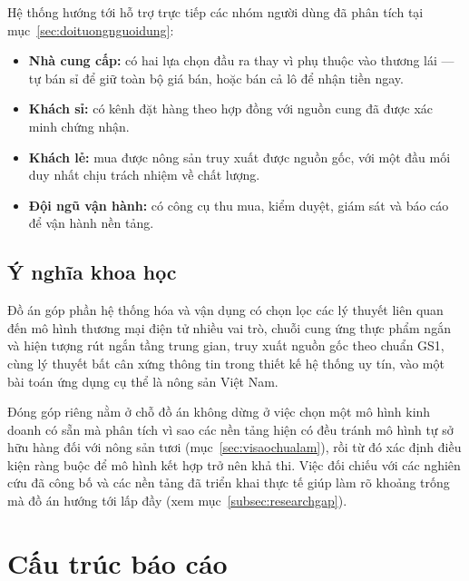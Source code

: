 Hệ thống hướng tới hỗ trợ trực tiếp các nhóm người dùng đã phân tích tại mục~\ref{sec:doituongnguoidung}:
\begin{itemize}
    \item \textbf{Nhà cung cấp:} có hai lựa chọn đầu ra thay vì phụ thuộc vào thương lái --- tự bán sỉ để giữ toàn bộ giá bán, hoặc bán cả lô để nhận tiền ngay.
    \item \textbf{Khách sỉ:} có kênh đặt hàng theo hợp đồng với nguồn cung đã được xác minh chứng nhận.
    \item \textbf{Khách lẻ:} mua được nông sản truy xuất được nguồn gốc, với một đầu mối duy nhất chịu trách nhiệm về chất lượng.
    \item \textbf{Đội ngũ vận hành:} có công cụ thu mua, kiểm duyệt, giám sát và báo cáo để vận hành nền tảng.
\end{itemize}

\subsection{Ý nghĩa khoa học}

Đồ án góp phần hệ thống hóa và vận dụng có chọn lọc các lý thuyết liên quan đến mô hình thương mại điện tử nhiều vai trò, chuỗi cung ứng thực phẩm ngắn và hiện tượng rút ngắn tầng trung gian, truy xuất nguồn gốc theo chuẩn GS1, cùng lý thuyết bất cân xứng thông tin trong thiết kế hệ thống uy tín, vào một bài toán ứng dụng cụ thể là nông sản Việt Nam.

Đóng góp riêng nằm ở chỗ đồ án không dừng ở việc chọn một mô hình kinh doanh có sẵn mà phân tích vì sao các nền tảng hiện có đều tránh mô hình tự sở hữu hàng đối với nông sản tươi (mục~\ref{sec:visaochualam}), rồi từ đó xác định điều kiện ràng buộc để mô hình kết hợp trở nên khả thi. Việc đối chiếu với các nghiên cứu đã công bố và các nền tảng đã triển khai thực tế giúp làm rõ khoảng trống mà đồ án hướng tới lấp đầy (xem mục~\ref{subsec:researchgap}).

\section{Cấu trúc báo cáo}

